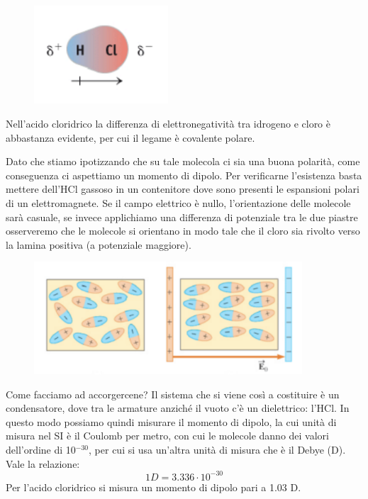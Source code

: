 \vspace{-0.4cm}\begin{figure}[htp]
    \centering
    \includegraphics[width=5cm]{immagini/HCl.png}
\end{figure}

\vspace{-0.4cm}Nell'acido cloridrico la differenza di elettronegatività tra idrogeno e cloro è abbastanza evidente, per cui il legame è covalente polare.

Dato che stiamo ipotizzando che su tale molecola ci sia una buona polarità, come conseguenza ci aspettiamo un momento di dipolo.
Per verificarne l'esistenza basta mettere dell'HCl gassoso in un contenitore dove sono presenti le espansioni polari di un elettromagnete. Se il campo elettrico è nullo, l'orientazione delle molecole sarà casuale, se invece applichiamo una differenza di potenziale tra le due piastre osserveremo che le molecole si orientano in modo tale che il cloro sia rivolto verso la lamina positiva (a potenziale maggiore).
\begin{figure}[htp]
    \centering
    \includegraphics[width=10cm]{immagini/condensatore.png}
\end{figure}
Come facciamo ad accorgercene?
Il sistema che si viene così a costituire è un condensatore, dove tra le armature anziché il vuoto c'è un dielettrico: l'HCl. In questo modo possiamo quindi misurare il momento di dipolo, la cui unità di misura nel SI è il Coulomb per metro, con cui le molecole danno dei valori dell'ordine di 10$^{-30}$, per cui si usa un'altra unità di misura che è il Debye (D). Vale la relazione:
$$1D=3.336\cdot10^{-30}$$
Per l'acido cloridrico si misura un momento di dipolo pari a 1.03 D.

